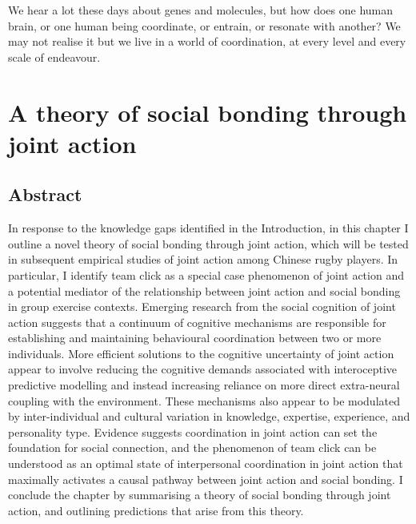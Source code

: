 
\begin{savequote}[8cm]

    We hear a lot these days about genes and molecules, but how does one human brain, or one human being coordinate, or entrain, or resonate with another?  We may not realise it but we live in a world of coordination, at every level and every scale of endeavour.

\end{savequote}




\chapter{\label{theory}A theory of social bonding through joint action}


\minitoc

\section{Abstract}
In response to the knowledge gaps identified in the Introduction, in this chapter I outline a novel theory of social bonding through joint action, which will be tested in subsequent empirical studies of joint action among Chinese rugby players.  In particular, I identify team click as a special case phenomenon of joint action and a potential mediator of the relationship between joint action and social bonding in group exercise contexts.  Emerging research from the social cognition of joint action suggests that a continuum of cognitive mechanisms are responsible for establishing and maintaining behavioural coordination between two or more individuals.  More efficient solutions to the cognitive uncertainty of joint action appear to involve reducing the cognitive demands associated with interoceptive predictive modelling and instead increasing reliance on more direct extra-neural coupling with the environment.  These mechanisms also appear to be modulated by inter-individual and cultural variation in knowledge, expertise, experience, and personality type.  Evidence suggests coordination in joint action can set the foundation for social connection, and the phenomenon of team click can be understood as an optimal state of interpersonal coordination in joint action that maximally activates a causal pathway between joint action and social bonding.  I conclude the chapter by summarising a theory of social bonding through joint action, and outlining predictions that arise from this theory.




